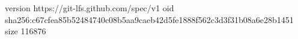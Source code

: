 version https://git-lfs.github.com/spec/v1
oid sha256:c67cfea85b52484740c08b5aa9caeb42d5fe1888f562c3d3f31b08a6e28b1451
size 116876

